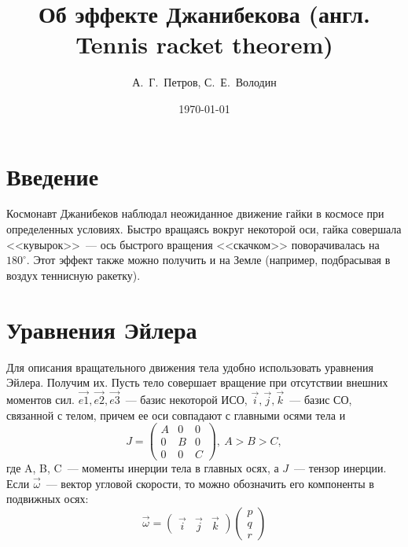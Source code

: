\documentclass{article}
\title{Об эффекте Джанибекова (англ. Tennis racket theorem)}
\date{\today}
\author{А.~Г.~Петров, С.~Е.~Володин}
\newcommand{\degree}{^{\circ}}
\begin{document}
\maketitle
\section{Введение}
Космонавт Джанибеков наблюдал неожиданное движение гайки в космосе при определенных условиях. Быстро вращаясь вокруг некоторой оси, гайка совершала <<кувырок>>~--- ось быстрого вращения <<скачком>> поворачивалась на \begin{math} 180\degree \end{math}. Этот эффект также можно получить и на Земле (например, подбрасывая в воздух теннисную ракетку).


\section{Уравнения Эйлера}
Для описания вращательного движения тела удобно использовать уравнения Эйлера. Получим их.
Пусть тело совершает вращение при отсутствии внешних моментов сил.
\begin{math}
\vec{e1}, \vec{e2}, \vec{e3}
\end{math}~--- базис некоторой ИСО,
\begin{math}
\vec{i}, \vec{j}, \vec{k}
\end{math}~--- базис СО, связанной с телом, причем ее оси совпадают с главными осями тела и
\begin{equation}
J=\left( \begin{array}{lcr} A & 0 & 0\\ 0 & B & 0\\ 0 & 0 & C \end{array} \right),\ A > B > C,
\end{equation}
где A, B, C~--- моменты инерции тела в главных осях, а \begin{math} J \end{math}~--- тензор инерции. Если \begin{math} \vec{\omega} \end{math}~--- вектор угловой скорости, то можно обозначить его компоненты в подвижных осях:
\begin{equation}
\vec{\omega}=
\left( \begin{array}{lcr} \vec{i} & \vec{j} & \vec{k} \end{array} \right)
\left( \begin{array}{lcr} p\\q\\r \end{array} \right)
\end{equation}
\end{document}
